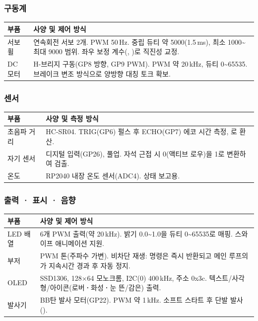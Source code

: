 \subsubsection{구동계}

\begin{longtable}{L{2.6cm} L{11.4cm}}
\toprule
{}\textbf{부품} & \textbf{사양 및 제어 방식} \\
\midrule
\endhead
서보 휠 & 연속회전 서보 2개. PWM 50\,Hz. 중립 듀티 약 5000(1.5\,ms),
  최소 1000\textasciitilde 최대 9000 범위. 좌우 보정 계수(,
  )로 직진성 교정. \\
DC 모터 & H-브리지 구동(GP8 방향, GP9 PWM). PWM 약 20\,kHz, 듀티 0\textasciitilde 65535.
  브레이크 변조 방식으로 양방향 대칭 토크 확보. \\
\bottomrule
\end{longtable}

\subsubsection{센서}

\begin{longtable}{L{2.6cm} L{11.4cm}}
\toprule
{}\textbf{부품} & \textbf{사양 및 측정 방식} \\
\midrule
\endhead
초음파 거리 & HC-SR04. TRIG(GP6) 펄스 후 ECHO(GP7) 에코 시간 측정,
  로 환산. \\
자기 센서 & 디지털 입력(GP26), 풀업. 자석 근접 시 0(액티브 로우)을 1로 변환하여 검출. \\
온도 & RP2040 내장 온도 센서(ADC4). 상태 보고용. \\
\bottomrule
\end{longtable}

\subsubsection{출력 \textbf{·} 표시 \textbf{·} 음향}

\begin{longtable}{L{2.6cm} L{11.4cm}}
\toprule
{}\textbf{부품} & \textbf{사양 및 제어 방식} \\
\midrule
\endhead
LED 배열 & 6개 PWM 출력(약 20\,kHz). 밝기 0.0\textasciitilde 1.0을 듀티
  0\textasciitilde 65535로 매핑. 스와이프 애니메이션 지원. \\
부저 & PWM 톤(주파수 가변). 비차단 재생: 명령은 즉시 반환되고 메인 루프의
  가 지속시간 경과 후 자동 정지. \\
OLED & SSD1306, 128$\times$64 모노크롬, I2C(0) 400\,kHz, 주소 0x3c.
  텍스트/사각형/아이콘(로버\textbf{·}화성\textbf{·}눈 뜬/감은) 출력. \\
발사기 & BB탄 발사 모터(GP22). PWM 약 1\,kHz. 소프트 스타트 후 단발 발사
  (). \\
\bottomrule
\end{longtable}

